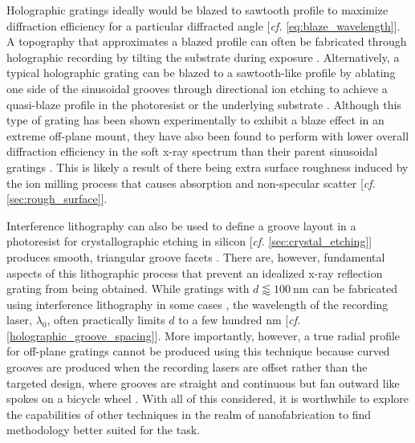 Holographic gratings ideally would be blazed to sawtooth profile to maximize diffraction efficiency for a particular diffracted angle [\emph{cf.\@} \cref{eq:blaze_wavelength}]. 
A topography that approximates a blazed profile can often be fabricated through holographic recording by tilting the substrate during exposure \cite{Loewen97}. 
Alternatively, a typical holographic grating can be blazed to a sawtooth-like profile by ablating one side of the sinusoidal grooves through directional ion etching to achieve a quasi-blaze profile in the photoresist or the underlying substrate \cite{Loewen97,Aoyagi76,Palmer95}. 
Although this type of grating has been shown experimentally to exhibit a blaze effect in an extreme off-plane mount, they have also been found to perform with lower overall diffraction efficiency in the soft x-ray spectrum than their parent sinusoidal gratings \cite{McEntaffer04,Miles15,Tutt16}. 
This is likely a result of there being extra surface roughness induced by the ion milling process that causes absorption and non-specular scatter [\emph{cf.\@} \cref{sec:rough_surface}]. 

Interference lithography can also be used to define a groove layout in a photoresist for crystallographic etching in silicon [\emph{cf.\@} \cref{sec:crystal_etching}] produces smooth, triangular groove facets \cite{Franke97,Chang03}. 
There are, however, fundamental aspects of this lithographic process that prevent an idealized x-ray reflection grating from being obtained. 
While gratings with $d \lessapprox \SI{100}{\nm}$ can be fabricated using interference lithography in some cases \cite[\emph{cf.\@} \cref{sec:summary_ch5}]{Chang08}, the wavelength of the recording laser, $\lambda_0$, often practically limits $d$ to a few hundred \si{\nm} [\emph{cf.\@} \cref{holographic_groove_spacing}]. 
More importantly, however, a true radial profile for off-plane gratings cannot be produced using this technique because curved grooves are produced when the recording lasers are offset rather than the targeted design, where grooves are straight and continuous but fan outward like spokes on a bicycle wheel \cite{Cash83}. 
With all of this considered, it is worthwhile to explore the capabilities of other techniques in the realm of nanofabrication to find methodology better suited for the task. 

